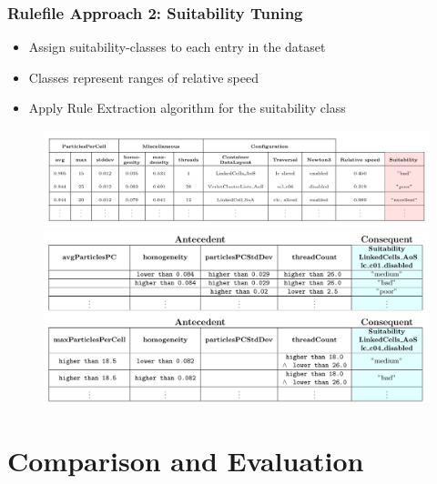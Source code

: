 \documentclass[
	10pt,
	t		%
]{beamer}
\begin{document}
\begin{frame}
	\frametitle{Rulefile Approach 2: Suitability Tuning}

	\begin{itemize}
		\item Assign suitability-classes to each entry in the dataset
		\item Classes represent ranges of relative speed
		\item Apply Rule Extraction algorithm for the suitability class
	\end{itemize}

	\begin{figure}
		\centering
		\includegraphics[width=1\textwidth, trim={0 2.25cm 0 0},clip]{figures/aggregated-data-suitability.png}
		\vspace{1.5cm}
		\includegraphics[width=1\textwidth, trim={0 9cm 0 0.1cm},clip]{figures/final-rules-suitability.png}
	\end{figure}
\end{frame}

\section{Comparison and Evaluation}
\end{document}
